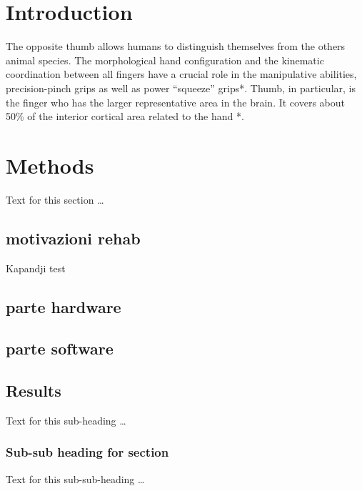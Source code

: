 \documentclass{bmcart}
\begin{document}


\section*{Introduction}

The opposite thumb allows humans to distinguish themselves from the others animal species. The morphological hand configuration and the kinematic coordination between all fingers have a crucial role in the manipulative abilities, precision-pinch grips as well as power “squeeze” grips*. Thumb, in particular, is the finger who has the larger representative area in the brain. It covers about 50\% of the interior cortical area related to the hand *. 




\section*{Methods}
Text for this section \ldots
\subsection*{motivazioni rehab}
Kapandji test 
\subsection*{parte hardware}
\subsection*{parte software}

\subsection*{Results}
Text for this sub-heading \ldots
\subsubsection*{Sub-sub heading for section}
Text for this sub-sub-heading \ldots
\end{document}
